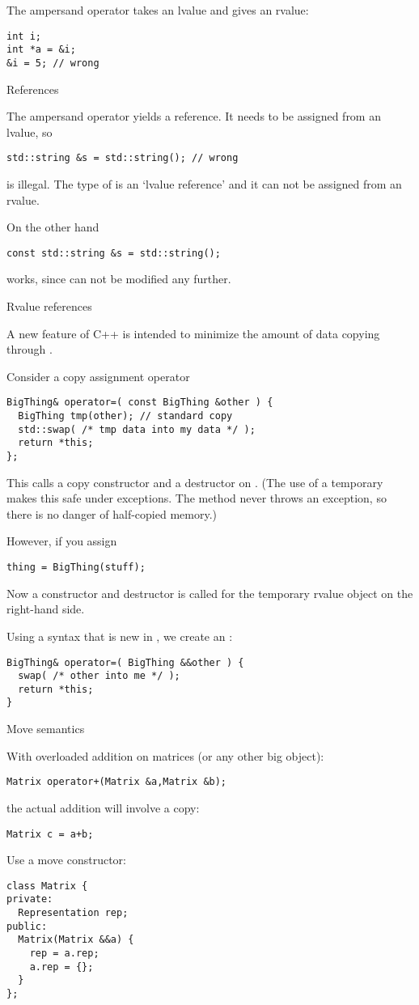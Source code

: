 The ampersand operator takes an lvalue and gives an rvalue:
\begin{verbatim}
int i;
int *a = &i;
&i = 5; // wrong
\end{verbatim}

 {References}

The ampersand operator yields a reference. It needs to be assigned
from an lvalue, so
\begin{verbatim}
std::string &s = std::string(); // wrong
\end{verbatim}
is illegal. The type of  is an `lvalue reference' and it can not
be assigned from an rvalue.

On the other hand
\begin{verbatim}
const std::string &s = std::string();
\end{verbatim}
works, since  can not be modified any further.

 {Rvalue references}
\label{sec:rvalue-ref}

A new feature of C++ is
intended to minimize the amount of data copying through
.

Consider a copy assignment operator
\begin{verbatim}
BigThing& operator=( const BigThing &other ) {
  BigThing tmp(other); // standard copy
  std::swap( /* tmp data into my data */ );
  return *this;
};
\end{verbatim}
This calls a copy constructor and a destructor on . (The use of
a temporary makes this safe under exceptions. The 
method never throws an exception, so there is no danger of half-copied
memory.)

However, if you assign
\begin{verbatim}
thing = BigThing(stuff);
\end{verbatim}
Now a constructor and destructor is called for the temporary rvalue object on
the right-hand side.

Using a syntax that is new in , we create an
:
\begin{verbatim}
BigThing& operator=( BigThing &&other ) {
  swap( /* other into me */ );
  return *this;
}
\end{verbatim}

 {Move semantics}

With overloaded addition on matrices (or any other big object):
\begin{lstlisting}
Matrix operator+(Matrix &a,Matrix &b);
\end{lstlisting}
the actual addition will involve a copy:
\begin{lstlisting}
Matrix c = a+b;
\end{lstlisting}

Use a move constructor:
\begin{lstlisting}
class Matrix {
private:
  Representation rep;
public:
  Matrix(Matrix &&a) {
    rep = a.rep;
    a.rep = {};
  }
};
\end{lstlisting}

